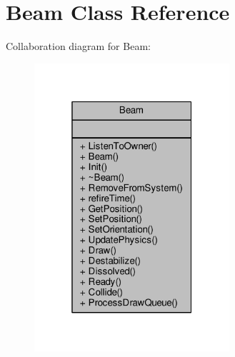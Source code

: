 \hypertarget{classBeam}{}\section{Beam Class Reference}
\label{classBeam}


Collaboration diagram for Beam\+:
\nopagebreak
\begin{figure}[H]
\begin{center}
\leavevmode
\includegraphics[width=205pt]{d6/d54/classBeam__coll__graph}
\end{center}
\end{figure}
